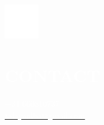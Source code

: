 \documentclass[../main.tex]{subfiles}
\begin{document}
    \hspace*{0.2cm}
    \begin{minipage}[t]{2cm}
        \vspace*{0.5cm}\includegraphics[width=1.5cm]{assets/contact.png}
    \end{minipage}
    \begin{minipage}[t]{5cm}
        \vspace*{0.5cm}

        \section*{\textcolor{white}{CONTACT}}
        \vspace*{-0.25cm}
        \textcolor{white}{
            +34 660810737 \\
            \underline{\href{mailto:talayaalba@gmail.com}{\textcolor{white}{talayaalba@gmail.com}}}
        }
    \end{minipage}
\end{document}
